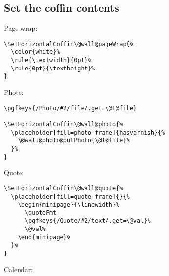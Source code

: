 \documentclass[11pt,oneside]{memoir-article}
\begin{document}
\subsection{Set the coffin contents}
\label{sec-10-5-4}

Page wrap:

\begin{verbatim}
\SetHorizontalCoffin\@wall@pageWrap{%
  \color{white}%
  \rule{\textwidth}{0pt}%
  \rule{0pt}{\textheight}%
}
\end{verbatim}

Photo:

\begin{verbatim}
\pgfkeys{/Photo/#2/file/.get=\@t@file}

\SetHorizontalCoffin\@wall@photo{%
  \placeholder[fill=photo-frame]{hasvarnish}{%
    \@wall@photo@putPhoto{\@t@file}%
  }%
}
\end{verbatim}

Quote:

\begin{verbatim}
\SetHorizontalCoffin\@wall@quote{%
  \placeholder[fill=quote-frame]{}{%
    \begin{minipage}{\linewidth}%
      \quoteFmt
      \pgfkeys{/Quote/#2/text/.get=\@val}%
      \@val%
    \end{minipage}%
  }%
}
\end{verbatim}

Calendar:
\end{document}
